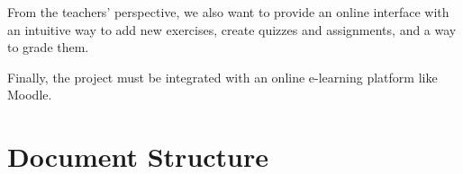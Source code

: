 From the teachers' perspective, we also want to provide an online interface with an intuitive way to add new exercises, create quizzes and assignments, and a way to grade them.

Finally, the project must be integrated with an online e-learning platform like Moodle.
\section{Document Structure}






